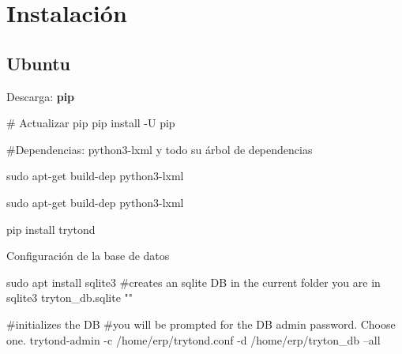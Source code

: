
\section{Instalación}

\subsection{Ubuntu}


	\begin{frame}[fragile=singleslide]{Descarga: \textbf{pip}}

        \begin{itmeize}

        \end{itmeize}

		\begin{mycode}[bash]
# Actualizar pip
pip install -U pip

#Dependencias: python3-lxml y todo su árbol de dependencias

sudo apt-get build-dep python3-lxml

sudo apt-get build-dep python3-lxml

pip install trytond
		\end{mycode}
    \end{frame}


	\begin{frame}[fragile=singleslide]{Configuración de la base de datos}

		\begin{mycode}[bash]
sudo apt install sqlite3
#creates an sqlite DB in the current folder you are in
sqlite3 tryton_db.sqlite ""

#initializes the DB
#you will be prompted for the DB admin password. Choose one.
trytond-admin -c /home/erp/trytond.conf -d /home/erp/tryton_db --all
		\end{mycode}
	\end{frame}

